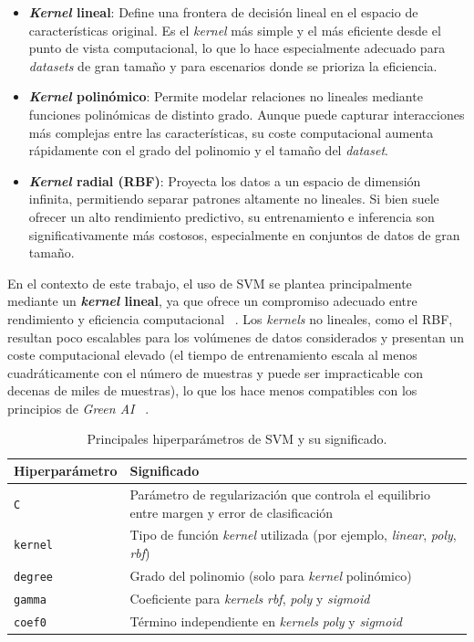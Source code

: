 \begin{itemize}
    \item \textbf{\textit{Kernel} lineal}: Define una frontera de decisión lineal en el espacio de características original. Es el \textit{kernel} más simple y el más eficiente desde el punto de vista computacional, lo que lo hace especialmente adecuado para \textit{datasets} de gran tamaño y para escenarios donde se prioriza la eficiencia.
    
    \item \textbf{\textit{Kernel} polinómico}: Permite modelar relaciones no lineales mediante funciones polinómicas de distinto grado. Aunque puede capturar interacciones más complejas entre las características, su coste computacional aumenta rápidamente con el grado del polinomio y el tamaño del \textit{dataset}.
    
    \item \textbf{\textit{Kernel} radial (RBF)}: Proyecta los datos a un espacio de dimensión infinita, permitiendo separar patrones altamente no lineales. Si bien suele ofrecer un alto rendimiento predictivo, su entrenamiento e inferencia son significativamente más costosos, especialmente en conjuntos de datos de gran tamaño.
\end{itemize}

En el contexto de este trabajo, el uso de SVM se plantea principalmente mediante un \textbf{\textit{kernel} lineal}, ya que ofrece un compromiso adecuado entre rendimiento y eficiencia computacional ~\cite{liblinear}. Los \textit{kernels} no lineales, como el RBF, resultan poco escalables para los volúmenes de datos considerados y presentan un coste computacional elevado (el tiempo de entrenamiento escala al menos cuadráticamente con el número de muestras y puede ser impracticable con decenas de miles de muestras), lo que los hace menos compatibles con los principios de \textit{Green AI} ~\cite{nonlinear_more_complexity}.

\begin{table}[H]
    \centering
    \caption{Principales hiperparámetros de SVM y su significado.}
    \label{tab:svm_hyperparams}
    \begin{tabular}{ll}
        \toprule
        \textbf{Hiperparámetro} & \textbf{Significado} \\
        \midrule
        \texttt{C} & Parámetro de regularización que controla el equilibrio entre margen y error de clasificación \\
        \texttt{kernel} & Tipo de función \textit{kernel} utilizada (por ejemplo, \textit{linear}, \textit{poly}, \textit{rbf}) \\
        \texttt{degree} & Grado del polinomio (solo para \textit{kernel} polinómico) \\
        \texttt{gamma} & Coeficiente para \textit{kernels} \textit{rbf}, \textit{poly} y \textit{sigmoid} \\
        \texttt{coef0} & Término independiente en \textit{kernels} \textit{poly} y \textit{sigmoid} \\
        \bottomrule
    \end{tabular}
\end{table}


